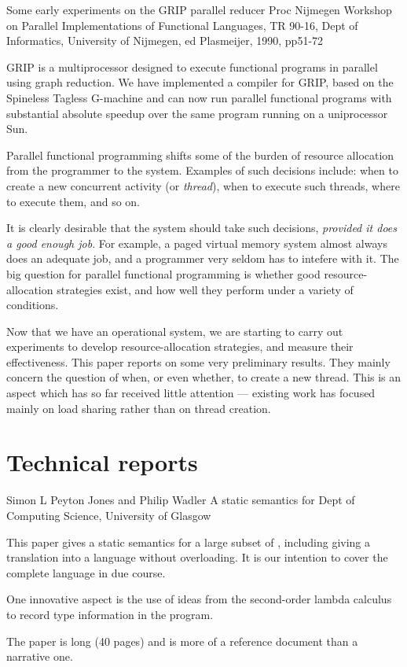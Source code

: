 {Some early experiments on the GRIP parallel reducer}
{Proc Nijmegen Workshop on Parallel Implementations of Functional Languages, TR 90-16, Dept
of Informatics, University of Nijmegen, ed Plasmeijer, 1990, pp51-72}
{
GRIP is a multiprocessor designed to execute functional programs in 
parallel using graph reduction.  We have implemented a compiler for
GRIP, based on the Spineless Tagless G-machine
and can now run parallel functional programs with substantial absolute
speedup over the same program running on a uniprocessor Sun.

Parallel functional programming shifts some of the burden of resource
allocation from the programmer to the system.  Examples of such
decisions include: when to create a new concurrent activity (or {\em
thread}), when to execute such threads, where to execute them, and so
on.

It is clearly desirable that the system should take such decisions,
{\em provided it does
a good enough job}.  For example, a paged virtual memory system
almost always does an adequate job, and a programmer very seldom
has to intefere with it.
The big question for parallel functional programming is whether good
resource-allocation strategies exist, and how well they perform under a 
variety of conditions.

Now that we have an operational system, we are starting to carry out
experiments to develop resource-allocation strategies, and measure
their effectiveness.  This paper reports on some very preliminary
results.  They mainly concern the question of when, or even whether,
to create a new thread.  This is an aspect which has so far received
little attention --- existing work has focused mainly
on load sharing rather than on thread creation.  
}


\section{Technical reports}

{Simon L Peyton Jones and Philip Wadler}
{A static semantics for \Haskell{}}
{Dept of Computing Science, University of Glasgow}
{
This paper gives a static semantics for a large subset of \Haskell{}, including
giving a translation into a language without overloading.
It is our intention to cover the complete language in due course.

One innovative aspect is the use of ideas from the second-order lambda
calculus to record type information in the program.

The paper is long (40 pages) and is more of a reference document than
a narrative one.
}

